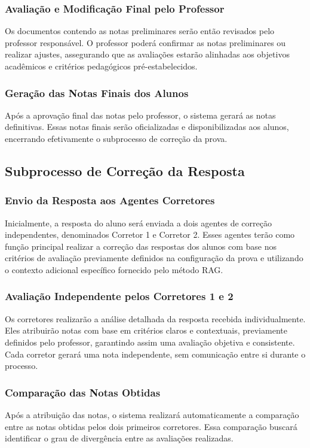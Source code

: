 \subsubsection{Avaliação e Modificação Final pelo Professor}
Os documentos contendo as notas preliminares serão então revisados pelo professor responsável. O professor poderá confirmar as notas preliminares ou realizar ajustes, assegurando que as avaliações estarão alinhadas aos objetivos acadêmicos e critérios pedagógicos pré-estabelecidos.

\subsubsection{Geração das Notas Finais dos Alunos}
Após a aprovação final das notas pelo professor, o sistema gerará as notas definitivas. Essas notas finais serão oficializadas e disponibilizadas aos alunos, encerrando efetivamente o subprocesso de correção da prova.

\subsection{Subprocesso de Correção da Resposta}

\subsubsection{Envio da Resposta aos Agentes Corretores}
Inicialmente, a resposta do aluno será enviada a dois agentes de correção independentes, denominados Corretor 1 e Corretor 2. Esses agentes terão como função principal realizar a correção das respostas dos alunos com base nos critérios de avaliação previamente definidos na configuração da prova e utilizando o contexto adicional específico fornecido pelo método RAG.

\subsubsection{Avaliação Independente pelos Corretores 1 e 2}
Os corretores realizarão a análise detalhada da resposta recebida individualmente. Eles atribuirão notas com base em critérios claros e contextuais, previamente definidos pelo professor, garantindo assim uma avaliação objetiva e consistente. Cada corretor gerará uma nota independente, sem comunicação entre si durante o processo.

\subsubsection{Comparação das Notas Obtidas}
Após a atribuição das notas, o sistema realizará automaticamente a comparação entre as notas obtidas pelos dois primeiros corretores. Essa comparação buscará identificar o grau de divergência entre as avaliações realizadas.

